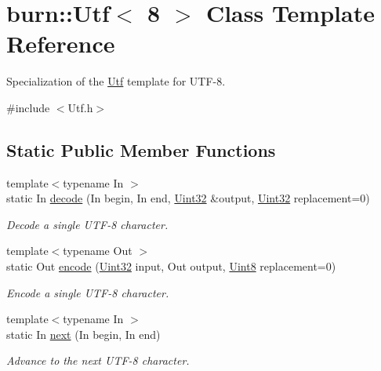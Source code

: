 \hypertarget{classburn_1_1_utf_3_018_01_4}{\section{burn\-:\-:Utf$<$ 8 $>$ Class Template Reference}
\label{classburn_1_1_utf_3_018_01_4}
}


Specialization of the \hyperlink{classburn_1_1_utf}{Utf} template for U\-T\-F-\/8.  




{\ttfamily \#include $<$Utf.\-h$>$}

\subsection*{Static Public Member Functions}
\begin{DoxyCompactItemize}
\item 
{\footnotesize template$<$typename In $>$ }\\static In \hyperlink{classburn_1_1_utf_3_018_01_4_a54503b85ffae32703b906888b4bcf119}{decode} (In begin, In end, \hyperlink{namespaceburn_ab40b09022209bd449d317c1f0e95356b}{Uint32} \&output, \hyperlink{namespaceburn_ab40b09022209bd449d317c1f0e95356b}{Uint32} replacement=0)
\begin{DoxyCompactList}\small\item\em Decode a single U\-T\-F-\/8 character. \end{DoxyCompactList}\item 
{\footnotesize template$<$typename Out $>$ }\\static Out \hyperlink{classburn_1_1_utf_3_018_01_4_a8920ff4fa72538e231bbe08820682caa}{encode} (\hyperlink{namespaceburn_ab40b09022209bd449d317c1f0e95356b}{Uint32} input, Out output, \hyperlink{namespaceburn_a184b59a040b9ef0ce2833c36dcea7656}{Uint8} replacement=0)
\begin{DoxyCompactList}\small\item\em Encode a single U\-T\-F-\/8 character. \end{DoxyCompactList}\item 
{\footnotesize template$<$typename In $>$ }\\static In \hyperlink{classburn_1_1_utf_3_018_01_4_ae0a0875668d26949550f88760b29623c}{next} (In begin, In end)
\begin{DoxyCompactList}\small\item\em Advance to the next U\-T\-F-\/8 character. \end{DoxyCompactList}\item 

\end{DoxyCompactItemize}
